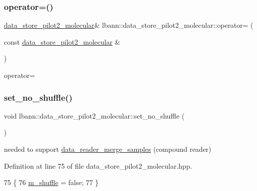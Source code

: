 \subsubsection{\texorpdfstring{operator=()}{operator=()}}
{\footnotesize\ttfamily \hyperlink{classlbann_1_1data__store__pilot2__molecular}{data\+\_\+store\+\_\+pilot2\+\_\+molecular}\& lbann\+::data\+\_\+store\+\_\+pilot2\+\_\+molecular\+::operator= (\begin{DoxyParamCaption}\item[{const \hyperlink{classlbann_1_1data__store__pilot2__molecular}{data\+\_\+store\+\_\+pilot2\+\_\+molecular} \&}]{ }\end{DoxyParamCaption})\hspace{0.3cm}{\ttfamily [default]}}



operator= 

\mbox{\label{classlbann_1_1data__store__pilot2__molecular_a6abbcb3996da1fd6ef165463ad27debe}} 
\subsubsection{\texorpdfstring{set\+\_\+no\+\_\+shuffle()}{set\_no\_shuffle()}}
{\footnotesize\ttfamily void lbann\+::data\+\_\+store\+\_\+pilot2\+\_\+molecular\+::set\+\_\+no\+\_\+shuffle (\begin{DoxyParamCaption}{ }\end{DoxyParamCaption})\hspace{0.3cm}{\ttfamily [inline]}}



needed to support \hyperlink{classlbann_1_1data__reader__merge__samples}{data\+\_\+reader\+\_\+merge\+\_\+samples} (compound reader) 



Definition at line 75 of file data\+\_\+store\+\_\+pilot2\+\_\+molecular.\+hpp.


\begin{DoxyCode}
75                         \{
76     \hyperlink{classlbann_1_1data__store__pilot2__molecular_afedbbd7592df7b60c71a7744eb8ccbf9}{m\_shuffle} = \textcolor{keyword}{false};
77   \}
\end{DoxyCode}
\mbox{\label{classlbann_1_1data__store__pilot2__molecular_a975d7907053a8b2e92ea5f77ca4ae7a3}} 

